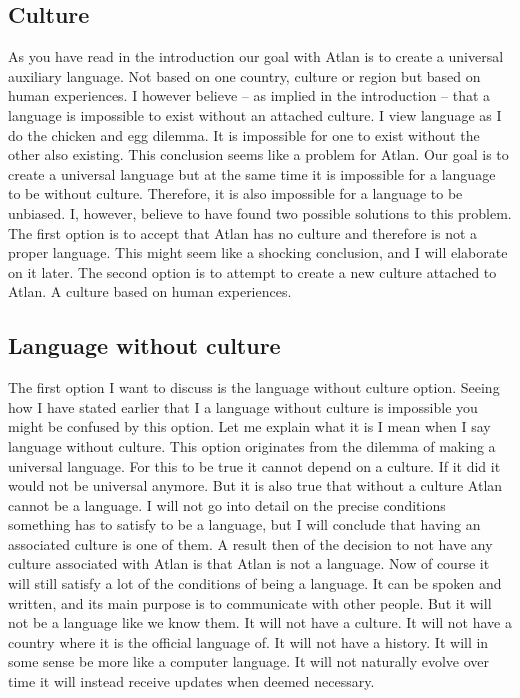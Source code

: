 \subsection{Culture}

\noindent As you have read in the introduction our goal with Atlan is to create a universal auxiliary language. Not based on one country, culture or region but based on human experiences. I however believe – as implied in the introduction – that a language is impossible to exist without an attached culture. I view language as I do the chicken and egg dilemma. It is impossible for one to exist without the other also existing. This conclusion seems like a problem for Atlan. Our goal is to create a universal language but at the same time it is impossible for a language to be without culture. Therefore, it is also impossible for a language to be unbiased. I, however, believe to have found  two possible solutions to this problem. The first option is to accept that Atlan has no culture and therefore is not a proper language. This might seem like a shocking conclusion, and I will elaborate on it later. The second option is to attempt to create a new culture attached to Atlan. A culture based on human experiences.  

\subsection{Language without culture} 

\noindent The first option I want to discuss is the language without culture option. Seeing how I have stated earlier that I a language without culture is impossible you might be confused by this option. Let me explain what it is I mean when I say language without culture. This option originates from the dilemma of making a universal language. For this to be true it cannot depend on a culture. If it did it would not be universal anymore. But it is also true that without a culture Atlan cannot be a language. I will not go into detail on the precise conditions something has to satisfy to be a language, but I will conclude that having an associated culture is one of them. A result then of the decision to not have any culture associated with Atlan is that Atlan is not a language. Now of course it will still satisfy a lot of the conditions of being a language. It can be spoken and written, and its main purpose is to communicate with other people. But it will not be a language like we know them. It will not have a culture. It will not have a country where it is the official language of. It will not have a history. It will in some sense be more like a computer language. It will not naturally evolve over time it will instead receive updates when deemed necessary.  

